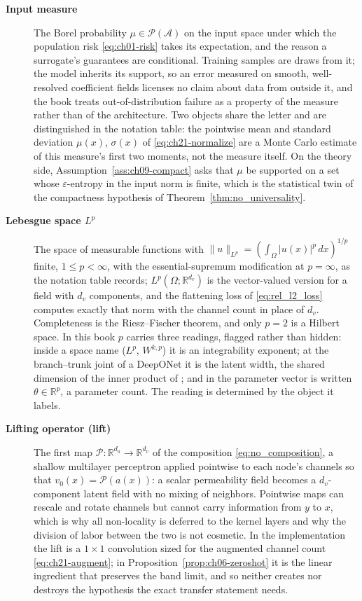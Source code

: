 \begin{description}
\item[\textbf{Input measure}] The Borel probability $\mu \in \mathcal{P}(\mathcal{A})$ on
the input space under which the population risk \eqref{eq:ch01-risk} takes its
expectation, and the reason a surrogate's guarantees are conditional. Training samples
are draws from it; the model inherits its support, so an error measured on smooth,
well-resolved coefficient fields licenses no claim about data from outside it, and the
book treats out-of-distribution failure as a property of the measure rather than of the
architecture. Two objects share the letter and are distinguished in the notation table:
the pointwise mean and standard deviation $\mu(x)$, $\sigma(x)$ of
\eqref{eq:ch21-normalize} are a Monte Carlo estimate of this measure's first two moments,
not the measure itself. On the theory side, Assumption~\ref{ass:ch09-compact} asks that
$\mu$ be supported on a set whose $\varepsilon$-entropy in the input norm is finite,
which is the statistical twin of the compactness hypothesis of
Theorem~\ref{thm:no_universality}. 

\item[\textbf{Lebesgue space $L^{p}$}] The space of measurable functions with
$\|u\|_{L^{p}} = (\int_{\Omega} |u(x)|^{p}\,dx)^{1/p}$ finite, $1 \le p < \infty$, with
the essential-supremum modification at $p = \infty$, as the notation table records;
$L^{p}(\Omega; \mathbb{R}^{d_{v}})$ is the vector-valued version for a field with $d_{v}$
components, and the flattening loss of \eqref{eq:rel_l2_loss} computes exactly that norm
with the channel count in place of $d_{v}$. Completeness is the Riesz--Fischer theorem, and only $p = 2$ is a Hilbert
space. In this book $p$ carries three readings, flagged rather than hidden: inside a
space name ($L^{p}$, $W^{k,p}$) it is an integrability exponent; at the branch--trunk
joint of a DeepONet it is the latent width, the shared dimension of the inner product
of ; and in
 the parameter vector is
written $\theta \in \mathbb{R}^{p}$, a parameter count. The reading is determined by
the object it labels. 

\item[\textbf{Lifting operator (lift)}] The first map $\mathcal{P} :
\mathbb{R}^{d_{a}} \to \mathbb{R}^{d_{v}}$ of the composition
\eqref{eq:no_composition}, a shallow multilayer perceptron applied pointwise to each
node's channels so that $v_{0}(x) = \mathcal{P}(a(x))$: a scalar permeability field
becomes a $d_{v}$-component latent field with no mixing of neighbors. Pointwise maps
can rescale and rotate channels but cannot carry information from $y$ to $x$, which is
why all non-locality is deferred to the kernel layers and why the division of labor
between the two is not cosmetic. In the implementation the lift is a $1 \times 1$
convolution sized for the augmented channel count \eqref{eq:ch21-augment}; in
Proposition~\ref{prop:ch06-zeroshot} it is the linear ingredient that preserves the band
limit, and so neither creates nor destroys the hypothesis the exact transfer statement
needs. 


\end{description}
